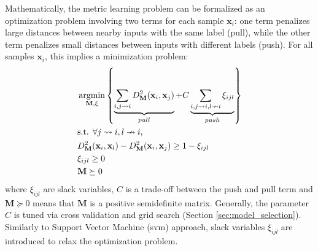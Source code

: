 %
Mathematically, the metric learning problem can be formalized as an optimization problem involving two terms for each sample $\textbf{x}_i$: one term penalizes large distances between nearby inputs with the same label (pull), while the other term penalizes small distances between inputs with different labels (push). For all samples $\textbf{x}_i$, this implies a minimization problem:
\begin{equation}
\begin{aligned}
&\displaystyle 		 \argmin_{\textbf{M},\xi} \left\lbrace \underbrace{
	\sum\limits_{i,j \rightsquigarrow i}
	D^2_\textbf{M}(\textbf{x}_i,\textbf{x}_j)
}_{pull}
+
C
\underbrace{
	\sum\limits_{i,j \rightsquigarrow i,l \nrightarrow i} \xi_{ijl}
}
_{push} \right\rbrace \\
&\text{s.t.  } \forall j \rightsquigarrow i, l \nrightarrow i, \\
& D^2_\textbf{M}(\textbf{x}_i,\textbf{x}_l) - D^2_\textbf{M}(\textbf{x}_i,\textbf{x}_j)  \geq 1-\xi_{ijl} \\
& \xi_{ijl} \geq 0 \\
& \textbf{M} \succeq 0
\label{eq:OptimizationProblem}
\end{aligned}
\end{equation}
\noindent where $\xi_{ijl}$ are slack variables, $C$ is a trade-off between the push and pull term and $\textbf{M} \succeq 0$ means that $\textbf{M}$ is a positive semidefinite matrix. Generally, the parameter $C$ is tuned via cross validation and grid search (Section \ref{sec:model_selection}). Similarly to Support Vector Machine ({\sc svm}) approach, slack variables $\xi_{ijl}$ are introduced to relax the optimization problem. 


